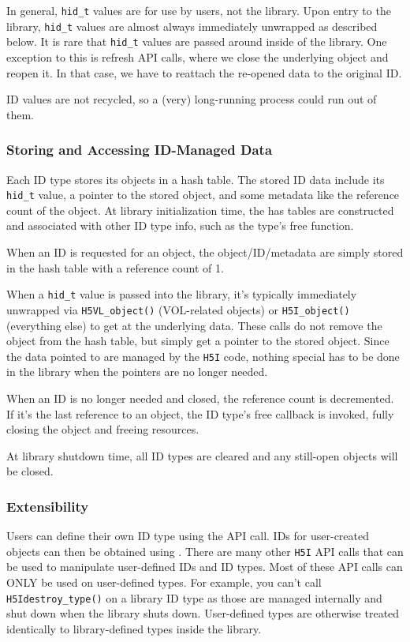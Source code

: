 In general, \texttt{hid\_t} values are for use by users, not the library. Upon entry to the library, \texttt{hid\_t} values are almost always immediately unwrapped as described below. It is rare that \texttt{hid\_t} values are passed around inside of the library. One exception to this is refresh API calls, where we close the underlying object and reopen it. In that case, we have to reattach the re-opened data to the original ID.

ID values are not recycled, so a (very) long-running process could run out of them.

\subsubsection{Storing and Accessing ID-Managed Data}

Each ID type stores its objects in a hash table. The stored ID data include its \texttt{hid\_t} value, a pointer to the stored object, and some metadata like the reference count of the object. At library initialization time, the has tables are constructed and associated with other ID type info, such as the type's free function.

When an ID is requested for an object, the object/ID/metadata are simply stored in the hash table with a reference count of 1.

When a \texttt{hid\_t} value is passed into the library, it's typically immediately unwrapped via \texttt{H5VL\_object()} (VOL-related objects) or \texttt{H5I\_object()} (everything else) to get at the underlying data. These calls do not remove the object from the hash table, but simply get a pointer to the stored object. Since the data pointed to are managed by the \texttt{H5I} code, nothing special has to be done in the library when the pointers are no longer needed.

When an ID is no longer needed and closed, the reference count is decremented. If it's the last reference to an object, the ID type's free callback is invoked, fully closing the object and freeing resources.

At library shutdown time, all ID types are cleared and any still-open objects will be closed.


\subsubsection{Extensibility}

Users can define their own ID type using the  API call. IDs for user-created objects can then be obtained using . There are many other \texttt{H5I} API calls that can be used to manipulate user-defined IDs and ID types. Most of these API calls can ONLY be used on user-defined types. For example, you can't call \texttt{H5Idestroy\_type()} on a library ID type as those are managed internally and shut down when the library shuts down. User-defined types are otherwise treated identically to library-defined types inside the library.

